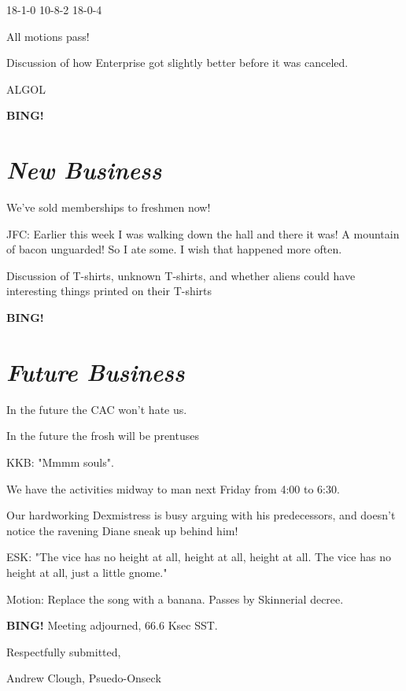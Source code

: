 \documentclass[10pt]{article}
\newcommand{\bing}{{\bf BING!} }
\newcommand{\goto}[1]{\bing \vskip 12pt \section*{{\em{#1}}}}
\begin{document}
18-1-0
10-8-2
18-0-4

All motions pass!

Discussion of how Enterprise got slightly better before it was canceled.

ALGOL

\goto{New Business}

We've sold memberships to freshmen now!

JFC:  Earlier this week I was walking down the hall and there it was!  A mountain of bacon unguarded!  So I ate some.  I wish that happened more often.

Discussion of T-shirts, unknown T-shirts, and whether aliens could have interesting things printed on their T-shirts

\goto{Future Business}

In the future the CAC won't hate us.

In the future the frosh will be prentuses

KKB:  "Mmmm souls".

We have the activities midway to man next Friday from 4:00 to 6:30.

Our hardworking Dexmistress is busy arguing with his predecessors, and doesn't notice the ravening Diane sneak up behind him!

ESK:  "The vice has no height at all, height at all, height at all.
The vice has no height at all, just a little gnome."

Motion:  Replace the song with a banana.  Passes by Skinnerial decree.

\bing
\noindent
Meeting adjourned, 66.6 Ksec SST.

\vspace{18pt}

\centerline{Respectfully submitted,}
\centerline{Andrew Clough, Psuedo-Onseck}
\end{document}
